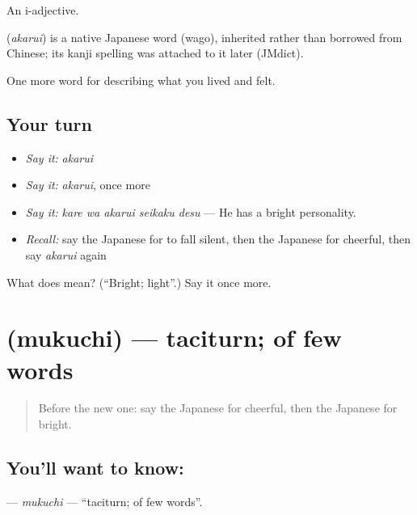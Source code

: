 An i-adjective.

\begin{cousinweb}
\textbf{} (\emph{akarui}) is a native Japanese word (wago), inherited rather than borrowed from Chinese; its kanji spelling was attached to it later (JMdict).
\end{cousinweb}

\begin{grammarlens}[title={What you've built}]
One more word for describing what you lived and felt.
\end{grammarlens}

\subsection*{Your turn}
\begin{itemize}
\raggedright
  \item \emph{Say it:} \emph{akarui}
  \item \emph{Say it:} \emph{akarui}, once more
  \item \emph{Say it:} \emph{kare wa akarui seikaku desu} — He has a bright personality.
  \item \emph{Recall:} say the Japanese for to fall silent, then the Japanese for cheerful, then say \emph{akarui} again
\end{itemize}

\begin{tcolorbox}[breakable,colback=teal!4,colframe=teal!35!black,title={Before you move on}]
What does  mean? (\textquotedblleft{}Bright; light\textquotedblright{}.) Say it once more.
\end{tcolorbox}
\section[\texorpdfstring{\ja{むくち} (mukuchi)}{むくち (mukuchi)}]{ (mukuchi) — taciturn; of few words}

\label{lesson:JA-C436-mukuchi}



\begin{quote}
Before the new one: say the Japanese for cheerful, then the Japanese for bright.
\end{quote}

\subsection*{You'll want to know: }
\textbf{} — \emph{mukuchi} — \textquotedblleft{}taciturn; of few words\textquotedblright{}.

